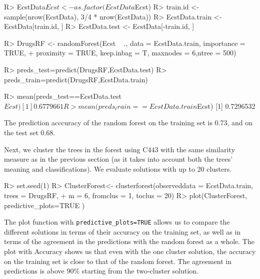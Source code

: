\begin{example}
R> EcstData$Ecst <- as.factor(EcstData$Ecst)
R> train.id <- sample(nrow(EcstData), 3/4 * nrow(EcstData))
R> EcstData.train <- EcstData[train.id, ]
R> EcstData.test <- EcstData[-train.id, ]

R> DrugsRF <- randomForest(Ecst ~ ., data = EcstData.train, importance = TRUE,
+   proximity = TRUE, keep.inbag = T, maxnodes = 6,ntree = 500)


R> preds_test=predict(DrugsRF,EcstData.test)
R> preds_train=predict(DrugsRF,EcstData.train)

R> mean(preds_test==EcstData.test$Ecst)
[1] 0.6779661
R> mean(preds_train==EcstData.train$Ecst)
[1] 0.7296532
\end{example}
The prediction acccuracy of the random forest on the training set is 0.73, and on the test set 0.68.

Next, we cluster the trees in the forest using C443 with the same similarity measure as in the previous section (as it takes into account both the trees' meaning and classifications). We evaluate solutions with up to 20 clusters. 
\begin{example}
R> set.seed(1)
R> ClusterForest<- clusterforest(observeddata = EcstData.train, trees = DrugsRF, 
+                              m = 6, fromclus = 1, toclus = 20)
R> plot(ClusterForest, predictive_plots=TRUE )
\end{example}
The plot function with \texttt{predictive\_plots=TRUE} allows us to compare the different solutions in terms of their accuracy on the training set, as well as in terms of the agreement in the predictions with the random forest as a whole. The plot with Accuracy shows us that even with the one cluster solution, the accuracy on the training set is close to that of the random forest. The agreement in predictions is above 90\% starting from the two-cluster solution. 


